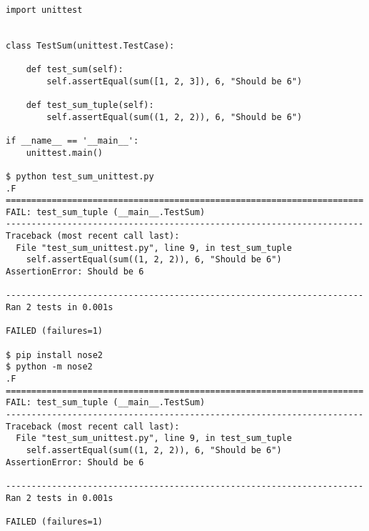 
\begin{lstlisting}

import unittest


class TestSum(unittest.TestCase):

    def test_sum(self):
        self.assertEqual(sum([1, 2, 3]), 6, "Should be 6")

    def test_sum_tuple(self):
        self.assertEqual(sum((1, 2, 2)), 6, "Should be 6")

if __name__ == '__main__':
    unittest.main()

$ python test_sum_unittest.py
.F
======================================================================
FAIL: test_sum_tuple (__main__.TestSum)
----------------------------------------------------------------------
Traceback (most recent call last):
  File "test_sum_unittest.py", line 9, in test_sum_tuple
    self.assertEqual(sum((1, 2, 2)), 6, "Should be 6")
AssertionError: Should be 6

----------------------------------------------------------------------
Ran 2 tests in 0.001s

FAILED (failures=1)

$ pip install nose2
$ python -m nose2
.F
======================================================================
FAIL: test_sum_tuple (__main__.TestSum)
----------------------------------------------------------------------
Traceback (most recent call last):
  File "test_sum_unittest.py", line 9, in test_sum_tuple
    self.assertEqual(sum((1, 2, 2)), 6, "Should be 6")
AssertionError: Should be 6

----------------------------------------------------------------------
Ran 2 tests in 0.001s

FAILED (failures=1)

\end{lstlisting}
